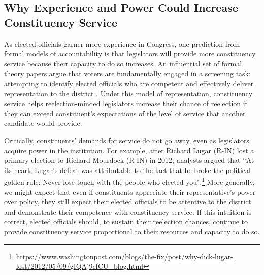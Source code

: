 \documentclass[12pt]{article}
\begin{document}
\subsection{Why Experience and Power Could Increase Constituency Service}


As elected officials garner more experience in Congress, one prediction from formal models of accountability is that legislators will provide more constituency service because their capacity to do so increases. An influential set of formal theory papers argue that voters are fundamentally engaged in a screening task: attempting to identify elected officials who are competent and effectively deliver representation to the district \citep{AshworthBuenodeMesquita2006, gordon2009advantages}. Under this model of representation, constituency service helps reelection-minded legislators increase their chance of reelection if they can exceed constituent's expectations of the level of service that another candidate would provide.  

Critically, constituents' demands for service do not go away, even as legislators acquire power in the institution. For example, after Richard Lugar (R-IN) lost a primary election to Richard Mourdock (R-IN) in 2012, analysts argued that ``At its heart, Lugar's defeat was attributable to the fact that he broke the political golden rule: Never lose touch with the people who elected you".\footnote{\url{https://www.washingtonpost.com/blogs/the-fix/post/why-dick-lugar-lost/2012/05/09/gIQAj9cfCU_blog.html}} %
More generally, we might expect that even if constituents appreciate their representative's power over policy, they still expect their elected officials to be attentive to the district and demonstrate their competence with constituency service. If this intuition is correct, elected officials should, to sustain their reelection chances, continue to provide constituency service proportional to their resources and capacity to do so. %
\end{document}
